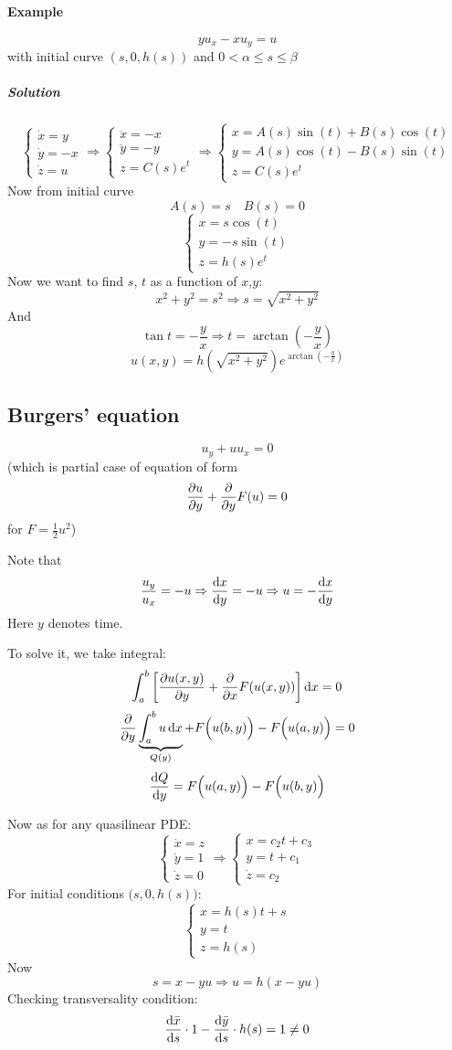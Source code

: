 \paragraph{Example}
$$yu_x - xu_y = u$$
with initial curve $(s,0,h(s))$ and $0<\alpha\leq s\leq \beta$
\subparagraph{Solution}
$$\begin{cases}
\dot{x} = y\\
\dot{y} = -x\\
\dot{z} = u
\end{cases} \Rightarrow \begin{cases}
\ddot{x} = -x\\
\ddot{y} = -y\\
z = C(s)e^t
\end{cases} \Rightarrow \begin{cases}
x = A(s)\sin(t)+B(s)\cos(t)\\
y = A(s)\cos(t)-B(s)\sin(t)\\
z = C(s)e^t
\end{cases}$$
Now from initial curve
$$A(s)= s \quad B(s) = 0$$
$$ \begin{cases}
x = s\cos(t)\\
y = -s\sin(t)\\
z = h(s)e^t
\end{cases}$$
Now we want to find $s$, $t$ as a function of $x$,$y$:
$$x^2+y^2 = s^2 \Rightarrow s = \sqrt{x^2+y^2}$$
And
$$\tan t  = -\frac{y}{x} \Rightarrow t = \arctan \left(-\frac{y}{x}\right)$$
$$u(x,y)  = h\left(\sqrt{x^2+y^2}\right)e^{ \arctan \left(-\frac{y}{x}\right)}$$


\subsection{Burgers' equation}
$$u_y + uu_x = 0$$
(which is partial case of equation of form $$\pdv{u}{y} + \pdv{ y} F(u) = 0$$ for $F=\frac{1}{2}u^2$)

Note that $$\frac{u_y}{u_x} = -u \Rightarrow \dv{x}{y} = - u \Rightarrow u = -\dv{x}{y}$$
Here $y$ denotes time.

To solve it, we take integral:
$$\int_a^b \left[ \pdv{ u(x,y)}{y} + \pdv {x} F(u(x,y))\right] \dd{x} = 0$$
$$\pdv{y} \underbrace{\int_a^b u \dd{x}}_{Q(y)}  + F\Big(u(b,y)\Big) - F\Big(u(a,y)\Big) = 0$$
$$\dv{Q}{y} = F\Big(u(a,y)\Big) - F\Big(u(b,y)\Big)$$

Now as for any quasilinear PDE:
$$\begin{cases}
\dot{x}= z\\\dot{y} = 1\\\dot{z}= 0
\end{cases} \Rightarrow \begin{cases}
x= c_2 t + c_3\\y = t + c_1\\\dot{z}= c_2
\end{cases} $$
For initial conditions $\Big(s,0,h(s)\Big)$:
$$ \begin{cases}
x= h(s) t + s\\y = t \\z= h(s)
\end{cases} $$
Now 
$$s=x-yu \Rightarrow u = h(x-yu)$$
Checking transversality condition:
$$\dv{\bar{x}}{s} \cdot 1 - \dv{\bar{y}}{s} \cdot h(s) = 1 \neq 0$$  


